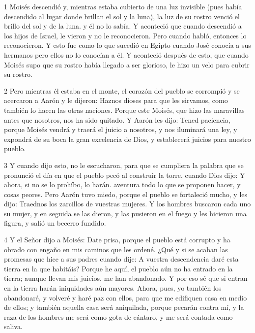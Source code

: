 \par 1 Moisés descendió y, mientras estaba cubierto de una luz invisible (pues había descendido al lugar donde brillan el sol y la luna), la luz de su rostro venció el brillo del sol y de la luna. y él no lo sabía. Y aconteció que cuando descendió a los hijos de Israel, le vieron y no le reconocieron. Pero cuando habló, entonces lo reconocieron. Y esto fue como lo que sucedió en Egipto cuando José conocía a sus hermanos pero ellos no lo conocían a él. Y aconteció después de esto, que cuando Moisés supo que su rostro había llegado a ser glorioso, le hizo un velo para cubrir su rostro.

\par 2 Pero mientras él estaba en el monte, el corazón del pueblo se corrompió y se acercaron a Aarón y le dijeron: Haznos dioses para que les sirvamos, como también lo hacen las otras naciones. Porque este Moisés, que hizo las maravillas antes que nosotros, nos ha sido quitado. Y Aarón les dijo: Tened paciencia, porque Moisés vendrá y traerá el juicio a nosotros, y nos iluminará una ley, y expondrá de su boca la gran excelencia de Dios, y establecerá juicios para nuestro pueblo.

\par 3 Y cuando dijo esto, no le escucharon, para que se cumpliera la palabra que se pronunció el día en que el pueblo pecó al construir la torre, cuando Dios dijo: Y ahora, si no se lo prohíbo, lo harán. aventura todo lo que se proponen hacer, y cosas peores. Pero Aarón tuvo miedo, porque el pueblo se fortaleció mucho, y les dijo: Traednos los zarcillos de vuestras mujeres. Y los hombres buscaron cada uno su mujer, y en seguida se las dieron, y las pusieron en el fuego y les hicieron una figura, y salió un becerro fundido.

\par 4 Y el Señor dijo a Moisés: Date prisa, porque el pueblo está corrupto y ha obrado con engaño en mis caminos que les ordené. ¿Qué y si se acaban las promesas que hice a sus padres cuando dije: A vuestra descendencia daré esta tierra en la que habitáis? Porque he aquí, el pueblo aún no ha entrado en la tierra; aunque llevan mis juicios, me han abandonado. Y por eso sé que si entran en la tierra harán iniquidades aún mayores. Ahora, pues, yo también los abandonaré, y volveré y haré paz con ellos, para que me edifiquen casa en medio de ellos; y también aquella casa será aniquilada, porque pecarán contra mí, y la raza de los hombres me será como gota de cántaro, y me será contada como saliva.

